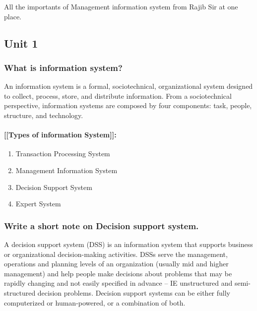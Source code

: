 \documentclass{memoir}
\begin{document}
  
All the importants of Management information system from Rajib Sir at
one place.

\hypertarget{unit-1}{%
\subsection{Unit 1}\label{unit-1}}

\hypertarget{what-is-information-system}{%
\subsubsection{What is information
system?}\label{what-is-information-system}}

An information system is a formal, sociotechnical, organizational system
designed to collect, process, store, and distribute information. From a
sociotechnical perspective, information systems are composed by four
components: task, people, structure, and technology.

\hypertarget{types-of-information-system}{%
\paragraph{{[}{[}Types of information
System{]}{]}:}\label{types-of-information-system}}

\begin{enumerate}
\item Transaction Processing System
\item Management Information System
\item Decision Support System
\item Expert System
\end{enumerate}

\hypertarget{write-a-short-note-on-decision-support-system.}{%
\subsubsection{Write a short note on Decision support
system.}\label{write-a-short-note-on-decision-support-system.}}

A decision support system (DSS) is an information system that supports
business or organizational decision-making activities. DSSs serve the
management, operations and planning levels of an organization (usually
mid and higher management) and help people make decisions about problems
that may be rapidly changing and not easily specified in advance -- IE
unstructured and semi-structured decision problems. Decision support
systems can be either fully computerized or human-powered, or a
combination of both.
\end{document}
